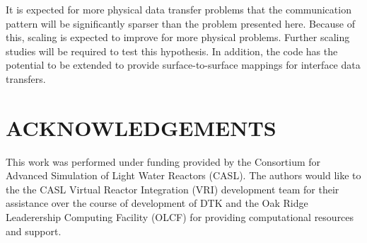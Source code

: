 \documentclass{mc2013}
\begin{document}
It is expected for more physical data transfer problems that the
communication pattern will be significantly sparser than the problem
presented here. Because of this, scaling is expected to improve for
more physical problems. Further scaling studies will be required to
test this hypothesis. In addition, the code has the potential to be
extended to provide surface-to-surface mappings for interface data
transfers.


\section*{ACKNOWLEDGEMENTS}

This work was performed under funding provided by the Consortium for
Advanced Simulation of Light Water Reactors (CASL). The authors would
like to the the CASL Virtual Reactor Integration (VRI) development
team for their assistance over the course of development of DTK and
the Oak Ridge Leaderership Computing Facility (OLCF) for providing
computational resources and support.

\setlength{\baselineskip}{12pt}


\end{document}
